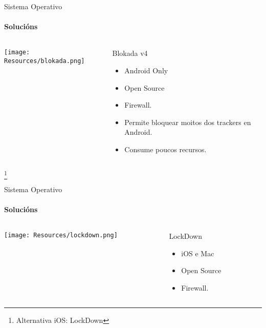 \documentclass{beamer}
\begin{document}
\begin{frame}{Sistema Operativo}
  \framesubtitle{Solucións}

  \begin{columns}
    \begin{column}{0.5\textwidth}
      \texttt{[image: Resources/blokada.png]}


    \end{column}

    \begin{column}{0.4\textwidth}
      \begin{block}{Blokada v4}
        \begin{itemize}
          \item Android Only
          \item Open Source
          \item Firewall.
          \item Permite bloquear moitos dos trackers en Android.
          \item Consume poucos recursos.
        \end{itemize}
      \end{block}

    \end{column}

  \end{columns}

  \footnote{Alternativa iOS: LockDown}

\end{frame}


\begin{frame}{Sistema Operativo}
  \framesubtitle{Solucións}

  \begin{columns}
    \begin{column}{0.5\textwidth}
      \texttt{[image: Resources/lockdown.png]}


    \end{column}

    \begin{column}{0.4\textwidth}
      \begin{block}{LockDown}
        \begin{itemize}
          \item iOS e Mac
          \item Open Source
          \item Firewall.
        \end{itemize}
      \end{block}

    \end{column}

  \end{columns}

\end{frame}
\end{document}
